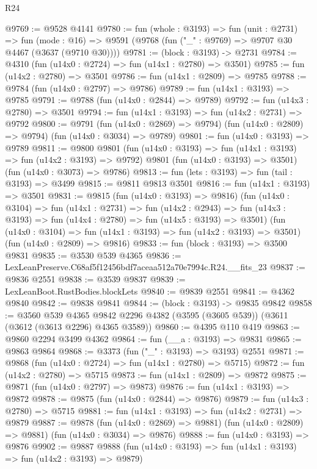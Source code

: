 \begin{lexlean}{R24}
\begin{coremodule}
@9769 := @9528 @4141
@9780 := fun (whole : @3193) =>
  fun (unit : @2731) =>
  fun (mode : @16) => @9591 (@9768 (fun ("_" : @9769) => @9707 @30 @4467 (@3637 (@9710 @30))))
@9781 := (block : @3193) -> @2731
@9784 := @4310 (fun (u14x0 : @2724) => fun (u14x1 : @2780) => @3501)
@9785 := fun (u14x2 : @2780) => @3501
@9786 := fun (u14x1 : @2809) => @9785
@9788 := @9784 (fun (u14x0 : @2797) => @9786)
@9789 := fun (u14x1 : @3193) => @9785
@9791 := @9788 (fun (u14x0 : @2844) => @9789)
@9792 := fun (u14x3 : @2780) => @3501
@9794 := fun (u14x1 : @3193) => fun (u14x2 : @2731) => @9792
@9800 := @9791
    (fun (u14x0 : @2869) => @9794)
    (fun (u14x0 : @2809) => @9794)
    (fun (u14x0 : @3034) => @9789)
@9801 := fun (u14x0 : @3193) => @9789
@9811 := @9800
    @9801
    (fun (u14x0 : @3193) => fun (u14x1 : @3193) => fun (u14x2 : @3193) => @9792)
    @9801
    (fun (u14x0 : @3193) => @3501)
    (fun (u14x0 : @3073) => @9786)
@9813 := fun (lets : @3193) => fun (tail : @3193) => @3499
@9815 := @9811 @9813 @3501
@9816 := fun (u14x1 : @3193) => @3501
@9831 := @9815
    (fun (u14x0 : @3193) => @9816)
    (fun (u14x0 : @3104) =>
    fun (u14x1 : @2731) =>
    fun (u14x2 : @2943) =>
    fun (u14x3 : @3193) => fun (u14x4 : @2780) => fun (u14x5 : @3193) => @3501)
    (fun (u14x0 : @3104) => fun (u14x1 : @3193) => fun (u14x2 : @3193) => @3501)
    (fun (u14x0 : @2809) => @9816)
@9833 := fun (block : @3193) => @3500 @9831
@9835 := @3530 @539 @4365
@9836 := LexLeanPreserve.C68af5f12456bdf7aceaa512a70e7994c.R24.__fits_23
@9837 := @9836 @2551
@9838 := @3539 @9837
@9839 := LexLeanBoot.RustBodies.blockLets
@9840 := @9839 @2551
@9841 := @4362 @9840
@9842 := @9838 @9841
@9844 := (block : @3193) -> @9835 @9842
@9858 := @3560
    @539
    @4365
    @9842
    @2296
    @4382
    (@3595 (@3605 @539))
    (@3611 (@3612 (@3613 @2296) @4365 @3589))
@9860 := @4395 @110 @419
@9863 := @9860 @2294 @3499 @4362
@9864 := fun (__a : @3193) => @9831
@9865 := @9863 @9864
@9868 := @3373 (fun ("_" : @3193) => @3193) @2551
@9871 := @9868 (fun (u14x0 : @2724) => fun (u14x1 : @2780) => @5715)
@9872 := fun (u14x2 : @2780) => @5715
@9873 := fun (u14x1 : @2809) => @9872
@9875 := @9871 (fun (u14x0 : @2797) => @9873)
@9876 := fun (u14x1 : @3193) => @9872
@9878 := @9875 (fun (u14x0 : @2844) => @9876)
@9879 := fun (u14x3 : @2780) => @5715
@9881 := fun (u14x1 : @3193) => fun (u14x2 : @2731) => @9879
@9887 := @9878
    (fun (u14x0 : @2869) => @9881)
    (fun (u14x0 : @2809) => @9881)
    (fun (u14x0 : @3034) => @9876)
@9888 := fun (u14x0 : @3193) => @9876
@9902 := @9887
    @9888
    (fun (u14x0 : @3193) => fun (u14x1 : @3193) => fun (u14x2 : @3193) => @9879)

\end{coremodule}
\end{lexlean}
